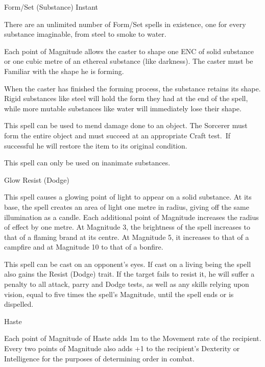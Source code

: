 \begin{samepage}
\begin{rpg-spell}
{Form/Set (Substance)}
{Instant}

There are an unlimited number of Form/Set spells in existence, one for every substance imaginable, from steel to smoke to water. 

Each point of Magnitude allows the caster to shape one ENC of solid substance or one cubic metre of an ethereal substance (like darkness). The caster must be Familiar with the shape he is forming. 

When the caster has finished the forming process, the substance retains its shape. Rigid substances like steel will hold the form they had at the end of the spell, while more mutable substances like water will immediately lose their shape. 

This spell can be used to mend damage done to an object. The Sorcerer must form the entire object and must succeed at an appropriate Craft test. If successful he will restore the item to its original condition. 

This spell can only be used on inanimate substances. 
\end{rpg-spell}
\end{samepage}


\begin{samepage}
\begin{rpg-spell}
{Glow}
{Resist (Dodge)}

This spell causes a glowing point of light to appear on a solid substance. At its base, the spell creates an area of light one metre in radius, giving off the same illumination as a candle. Each additional point of Magnitude increases the radius of effect by one metre. At Magnitude 3, the brightness of the spell increases to that of a flaming brand at its centre. At Magnitude 5, it increases to that of a campfire and at Magnitude 10 to that of a bonfire. 

This spell can be cast on an opponent’s eyes. If cast on a living being the spell also gains the Resist (Dodge) trait. If the target fails to resist it, he will suffer a penalty to all attack, parry and Dodge tests, as well as any skills relying upon vision, equal to five times the spell’s Magnitude, until the spell ends or is dispelled. 
\end{rpg-spell}
\end{samepage}


\begin{samepage}
\begin{rpg-spell}
{Haste}
{}

Each point of Magnitude of Haste adds 1m to the Movement rate of the recipient. Every two points of Magnitude also adds +1 to the recipient’s Dexterity or Intelligence for the purposes of determining order in combat. 
\end{rpg-spell}
\end{samepage}


